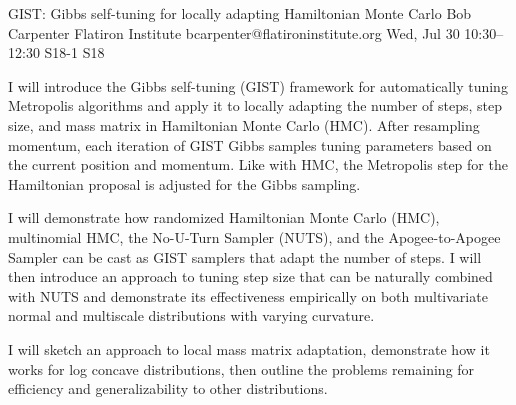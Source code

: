 \begin{talk}
  {GIST: Gibbs self-tuning for locally adapting Hamiltonian Monte Carlo}%
  {Bob Carpenter}%
  {Flatiron Institute}%
  {bcarpenter@flatironinstitute.org}%
  {}%
  {}%
  {Wed, Jul 30 10:30–12:30}%
  {S18-1}%
  {S18}%
  {}%
  
				
			
I will introduce the Gibbs self-tuning (GIST) framework for automatically tuning Metropolis algorithms and apply it to locally adapting the number of steps, step size, and mass matrix in Hamiltonian Monte Carlo (HMC).  After resampling momentum, each iteration of GIST Gibbs samples tuning parameters based on the current position and momentum.  Like with HMC, the Metropolis step for the Hamiltonian proposal is adjusted for the Gibbs sampling.

I will demonstrate how randomized Hamiltonian Monte Carlo (HMC), multinomial HMC, the No-U-Turn Sampler (NUTS), and the Apogee-to-Apogee Sampler can be cast as GIST samplers that adapt the number of steps.  I will then introduce an approach to tuning step size that can be naturally combined with NUTS and demonstrate its effectiveness empirically on both multivariate normal and multiscale distributions with varying curvature.  

I will sketch an approach to local mass matrix adaptation, demonstrate how it works for log concave distributions, then outline the problems remaining for efficiency and generalizability to other distributions.

\end{talk}


